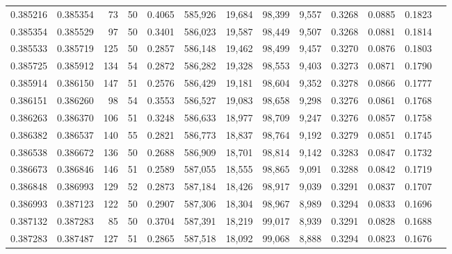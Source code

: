 \begin{tabular}{rrrrrrrrrrrrr}
0.385216 & 0.385354 &    73 &  50 &                                     0.4065 & 585,926 &  19,684 &  98,399 &   9,557 & 0.3268 & 0.0885 & 0.1823 \\
0.385354 & 0.385529 &    97 &  50 &                                     0.3401 & 586,023 &  19,587 &  98,449 &   9,507 & 0.3268 & 0.0881 & 0.1814 \\
0.385533 & 0.385719 &   125 &  50 &                                     0.2857 & 586,148 &  19,462 &  98,499 &   9,457 & 0.3270 & 0.0876 & 0.1803 \\
0.385725 & 0.385912 &   134 &  54 &                                     0.2872 & 586,282 &  19,328 &  98,553 &   9,403 & 0.3273 & 0.0871 & 0.1790 \\
0.385914 & 0.386150 &   147 &  51 &                                     0.2576 & 586,429 &  19,181 &  98,604 &   9,352 & 0.3278 & 0.0866 & 0.1777 \\
0.386151 & 0.386260 &    98 &  54 &                                     0.3553 & 586,527 &  19,083 &  98,658 &   9,298 & 0.3276 & 0.0861 & 0.1768 \\
0.386263 & 0.386370 &   106 &  51 &                                     0.3248 & 586,633 &  18,977 &  98,709 &   9,247 & 0.3276 & 0.0857 & 0.1758 \\
0.386382 & 0.386537 &   140 &  55 &                                     0.2821 & 586,773 &  18,837 &  98,764 &   9,192 & 0.3279 & 0.0851 & 0.1745 \\
0.386538 & 0.386672 &   136 &  50 &                                     0.2688 & 586,909 &  18,701 &  98,814 &   9,142 & 0.3283 & 0.0847 & 0.1732 \\
0.386673 & 0.386846 &   146 &  51 &                                     0.2589 & 587,055 &  18,555 &  98,865 &   9,091 & 0.3288 & 0.0842 & 0.1719 \\
0.386848 & 0.386993 &   129 &  52 &                                     0.2873 & 587,184 &  18,426 &  98,917 &   9,039 & 0.3291 & 0.0837 & 0.1707 \\
0.386993 & 0.387123 &   122 &  50 &                                     0.2907 & 587,306 &  18,304 &  98,967 &   8,989 & 0.3294 & 0.0833 & 0.1696 \\
0.387132 & 0.387283 &    85 &  50 &                                     0.3704 & 587,391 &  18,219 &  99,017 &   8,939 & 0.3291 & 0.0828 & 0.1688 \\
0.387283 & 0.387487 &   127 &  51 &                                     0.2865 & 587,518 &  18,092 &  99,068 &   8,888 & 0.3294 & 0.0823 & 0.1676 \\

\end{tabular}
